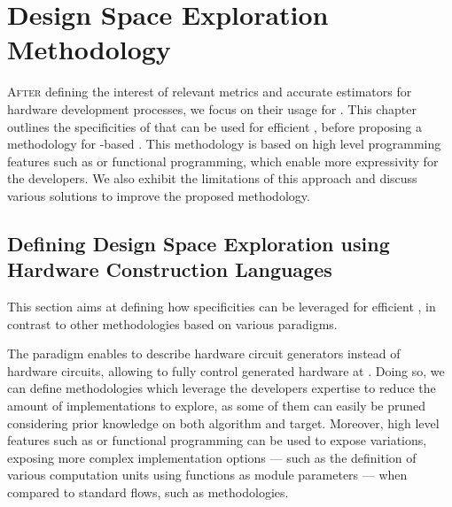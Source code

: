 \chapter{Design Space Exploration Methodology}


\lettrine[lines=2]{A}{fter} defining the interest of relevant metrics and accurate estimators for hardware development processes, we focus on their usage for .
This chapter outlines the specificities of  that can be used for efficient , before proposing a methodology for -based .
This methodology is based on high level programming features such as  or functional programming, which enable more expressivity for the developers.
We also exhibit the limitations of this approach and discuss various solutions to improve the proposed methodology.

\vspace*{\fill}
\minitoc 
\mtcskip 

\newpage

\section[Defining DSE in a HCL context]{Defining Design Space Exploration using Hardware Construction Languages}
\label{ch.dse:sec.definition}

    This section aims at defining how  specificities can be leveraged for efficient , in contrast to other  methodologies based on various paradigms.

    The  paradigm enables to describe hardware circuit generators instead of hardware circuits, allowing to fully control generated hardware at .
    Doing so, we can define  methodologies which leverage the developers expertise to reduce the amount of implementations to explore, as some of them can easily be pruned considering prior knowledge on both algorithm and target.
    Moreover, high level features such as  or functional programming can be used to expose variations, exposing more complex implementation options --- such as the definition of various computation units using functions as module parameters --- when compared to standard  flows, such as  methodologies.

